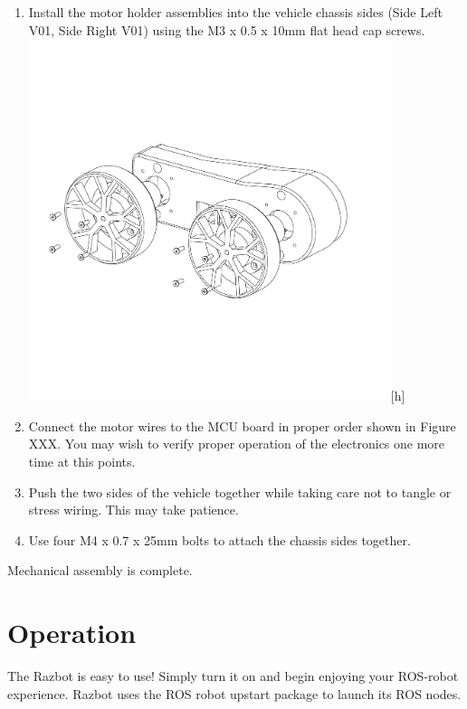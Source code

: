 \documentclass[12pt,titlepage,oneside]{memoir}
\begin{document}
\begin{enumerate}
\item Install the motor holder assemblies into the vehicle chassis sides (Side Left V01, Side Right V01) using the M3 x 0.5 x 10mm flat head cap screws.\\
\includegraphics[width=400px]{assem/step4.PDF}[h]
\item Connect the motor wires to the MCU board in proper order shown in Figure XXX. You may wish to verify proper operation of the electronics one more time at this points.\\
\item Push the two sides of the vehicle together while taking care not to tangle or stress wiring. This may take patience. 
\item Use four M4 x 0.7 x 25mm bolts to attach the chassis sides together.

\end{enumerate}

Mechanical assembly is complete.

\chapter{Operation}

The Razbot is easy to use! Simply turn it on and begin enjoying your ROS-robot experience.
Razbot uses the ROS robot upstart package to launch its ROS nodes.
\end{document}
